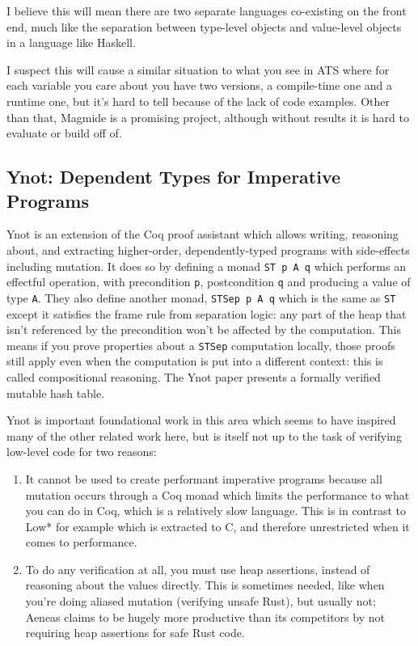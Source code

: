 \documentclass[12pt,twoside]{report}
\begin{document}
I believe this will mean there are two separate languages co-existing on the front end, much like the separation between type-level objects and value-level objects in a language like Haskell.

I suspect this will cause a similar situation to what you see in ATS where for each variable you care about you have two versions, a compile-time one and a runtime one, but it's hard to tell because of the lack of code examples. Other than that, Magmide is a promising project, although without results it is hard to evaluate or build off of.

\subsection{Ynot: Dependent Types for Imperative Programs}
Ynot\citep{nanevski_ynot_2008} is an extension of the Coq proof assistant which allows writing, reasoning about, and extracting higher-order, dependently-typed programs with side-effects including mutation. It does so by defining a monad \verb|ST p A q| which performs an effectful operation, with precondition \verb|p|, postcondition \verb|q| and producing a value of type \verb|A|. They also define another monad, \verb|STSep p A q| which is the same as \verb|ST| except it satisfies the frame rule from separation logic: any part of the heap that isn't referenced by the precondition won't be affected by the computation. This means if you prove properties about a \verb|STSep| computation locally, those proofs still apply even when the computation is put into a different context: this is called compositional reasoning. The Ynot paper presents a formally verified mutable hash table.

Ynot is important foundational work in this area which seems to have inspired many of the other related work here, but is itself not up to the task of verifying low-level code for two reasons:

\begin{enumerate}
  \item It cannot be used to create performant imperative programs because all mutation occurs through a Coq monad which limits the performance to what you can do in Coq, which is a relatively slow language. This is in contrast to Low*\citep{protzenko_low_2017} for example which is extracted to C, and therefore unrestricted when it comes to performance.
  \item To do any verification at all, you must use heap assertions, instead of reasoning about the values directly. This is sometimes needed, like when you're doing aliased mutation (verifying unsafe Rust), but usually not; Aeneas\citep{aeneas} claims to be hugely more productive than its competitors by not requiring heap assertions for safe Rust code.
\end{enumerate}
\end{document}
